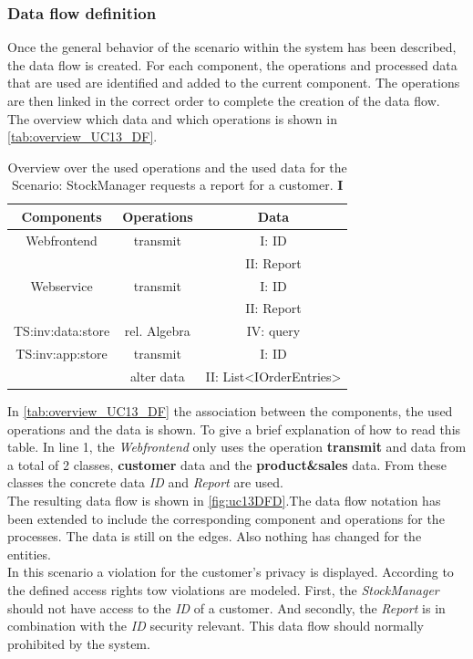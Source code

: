 \subsubsection{Data flow definition}
Once the general behavior of the scenario within the system has been described, the data flow is created. For each component, the operations and processed data that are used are identified and added to the current component. The operations are then linked in the correct order to complete the creation of the data flow.\\
The overview which data and which operations is shown in \autoref{tab:overview_UC13_DF}.
\begin{table}
\begin{tabular}{|c|c|c|}
\hline 
Components & Operations & Data \\ 
\hline 
Webfrontend & transmit & I: ID  \\
& & II: Report \\
\hline 
Webservice & transmit & I: ID \\ 
& & II: Report \\ 
\hline 
TS:inv:data:store & rel. Algebra & IV: query \\ 
\hline 
TS:inv:app:store & transmit & I: ID  \\ 
& alter data & II: List<IOrderEntries>  \\
\hline 
\end{tabular} 
\caption{Overview over the used operations and the used data for the Scenario: StockManager requests a report for a customer. \textbf{I}}
\label{tab:overview_UC13_DF}
\end{table}
In \autoref{tab:overview_UC13_DF} the association between the components, the used operations and the data is shown. To give a brief explanation of how to read this table. In line 1, the \textit{Webfrontend} only uses the operation \textbf{transmit} and data from a total of 2 classes,  \textbf{customer} data and the \textbf{product\&sales} data. From these classes the concrete data \textit{ID} and \textit{Report} are used.\\
The resulting data flow is shown in \autoref{fig:uc13DFD}.The data flow notation has been extended to include the corresponding component and operations for the processes. The data is still on the edges. Also nothing has changed for the entities.\\
In this scenario a violation for the customer's privacy is displayed. According to the defined access rights tow violations are modeled. First, the \textit{StockManager} should not have access to the \textit{ID} of a customer. And secondly, the \textit{Report} is in combination with the \textit{ID} security relevant. This  data flow should normally prohibited by the system.
